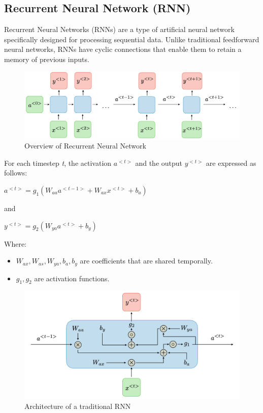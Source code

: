 \documentclass{ieeeojies}
\begin{document}
\subsection{Recurrent Neural Network (RNN)}
Recurrent Neural Networks (RNNs) are a type of artificial neural network specifically designed for processing sequential data. Unlike traditional feedforward neural networks, RNNs have cyclic connections that enable them to retain a memory of previous inputs.
\begin{figure}[H]
	\centering
	\begin{minipage}{0.32\textwidth}
		\centering
		\includegraphics[width=1\textwidth]{bibliography/Images/RNN_Img1.png}
		\caption{Overview of Recurrent Neural Network}
		\label{fig:1}
	\end{minipage}
\end{figure}
For each timestep \textit{t}, the activation $a^{<t>}$ and the output $y^{<t>}$ are expressed as follows:
\newline \centerline{$a^{<t>} = g_{1}(W_{aa}a^{<t-1>} + W_{ax}x^{<t>} + b_{a})$}
\newline and
\newline \centerline{$y^{<t>} = g_{2}(W_{ya}a^{<t>} +b_{y})$}
\newline Where:
\begin{itemize}
	\item $W_{ax}, W_{as}, W_{ya}, b_{a}, b_{y}$ are coefficients that are shared temporally.
	\item $g_{1}, g_{2}$ are activation functions.
\end{itemize}
\begin{figure}[H]
	\centering
	\begin{minipage}{0.32\textwidth}
		\centering
		\includegraphics[width=1\textwidth]{bibliography/Images/RNN_Img2.png}
		\caption{Architecture of a traditional RNN}
		\label{fig:1}
	\end{minipage}
\end{figure}
\end{document}
